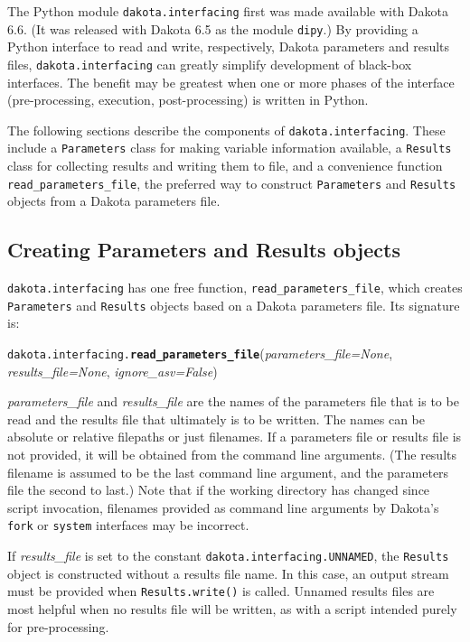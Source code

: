 The Python module {\tt dakota.interfacing} first was made available with Dakota 6.6. (It was released with 
Dakota 6.5 as the module {\tt dipy}.) By providing a Python interface to read and write, respectively,
Dakota parameters and results files, {\tt dakota.interfacing} can greatly simplify development of black-box
interfaces. The benefit may be greatest when one or more phases of the interface (pre-processing, execution,
post-processing) is written in Python.

The following sections describe the components of {\tt dakota.interfacing}. These include a {\tt Parameters}
class for making variable information available, a {\tt Results} class for collecting results and writing
them to file, and a convenience function {\tt read\_parameters\_file}, the preferred way to construct 
{\tt Parameters} and {\tt Results} objects from a Dakota parameters file.

\subsection{Creating Parameters and Results objects}

{\tt dakota.interfacing} has one free function, {\tt read\_parameters\_file}, which creates {\tt Parameters}
and {\tt Results} objects based on a Dakota parameters file. Its signature is:

\label{index:dakota.interfacing.read_parameters_file}\texttt{dakota.interfacing.}\textbf{\texttt{read\_parameters\_file}}({\emph{parameters\_file=None}, \emph{results\_file=None}, \emph{ignore\_asv=False}}){}

\emph{parameters\_file} and \emph{results\_file} are the names of the parameters file that is to be read
and the results file that  ultimately is to be written. The names can be  absolute or relative filepaths or
just filenames. If a parameters file or results file is not provided, it will be obtained from the command 
line arguments. (The results filename is assumed to be the last command line argument, and the parameters 
file the second to last.) Note that if the working directory has changed since script invocation, filenames
provided as command line arguments by Dakota's {\tt fork} or {\tt system} interfaces may be incorrect.

If \emph{results\_file} is set to the constant {\tt dakota.interfacing.UNNAMED}, the {\tt Results} object
is constructed without a results file name.  In this case, an output stream must be provided when {\tt Results.write()}
is called. Unnamed results files are most helpful when no results file will be written, as with a script
intended purely for pre-processing.

